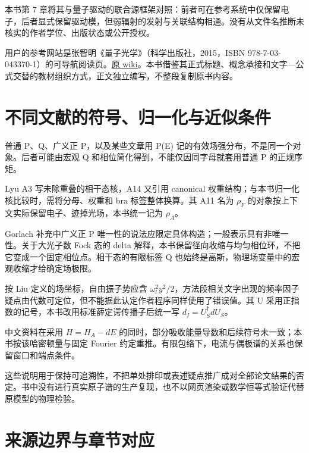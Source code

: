 \documentclass[UTF8,a4paper,zihao=-4,openany,fontset=fandol]{ctexbook}
\begin{document}
本书第 7 章将其与量子驱动的联合源框架对照：前者可在参考系统中仅保留电子，后者显式保留驱动模，但弱辐射的发射与关联结构相通。没有从文件名推断未核实的作者学位、出版状态或公开授权。



用户的参考网站是张智明《量子光学》（科学出版社，2015，ISBN 978-7-03-043370-1）的可导航阅读页。\href{https://claude.nx.kg/ql/wiki/}{原 wiki}。本书借鉴其正式标题、概念承接和文字—公式交替的教材组织方式，正文独立编写，不整段复制原书内容。



\section{不同文献的符号、归一化与近似条件}\label{sec:E:5}


普通 P、Q、广义正 P，以及某些文章用 P(E) 记的有效场强分布，不是同一个对象。后者可能由宏观 Q 和相位简化得到，不能仅因同字母就套用普通 P 的正规序矩。



Lyu A3 写未除重叠的相干态核，A14 又引用 canonical 权重结构；与本书归一化核比较时，需将分母、权重和 bra 标签整体换算。其 A11 名为 $\rho_F$ 的对象按上下文实际保留电子、迹掉光场，本书统一记为 $\rho_A$。



Gorlach 补充中广义正 P 唯一性的说法应限定具体构造；一般表示具有非唯一性。关于大光子数 Fock 态的 delta 解释，本书保留径向收缩与均匀相位环，不把它变成一个固定相位点。相干态的有限标签 Q 也始终是高斯，物理场变量中的宏观收缩才给确定场极限。



按 Liu 定义的场坐标，自由振子势应含 $\omega_l^2y^2/2$，方法段相关文字出现的频率因子疑点由代数可定位，但不能据此认定作者程序同样使用了错误值。其 U 采用正指数的记号，本书改用标准薛定谔传播子后统一写 $d_I=U_S^\dagger dU_S$。



中文资料在采用 $H=H_A-dE$ 的同时，部分吸收能量导数和后续符号未一致；本书按该哈密顿量与固定 Fourier 约定重推。有限包络下，电流与偶极谱的关系也保留窗口和端点条件。



这些说明用于保持可追溯性，不把单处排印或表述疑点推广成对全部论文结果的否定。书中没有进行真实原子谱的生产复现，也不以网页渲染或数学恒等式验证代替原模型的物理检验。



\section{来源边界与章节对应}\label{sec:E:6}
\end{document}
